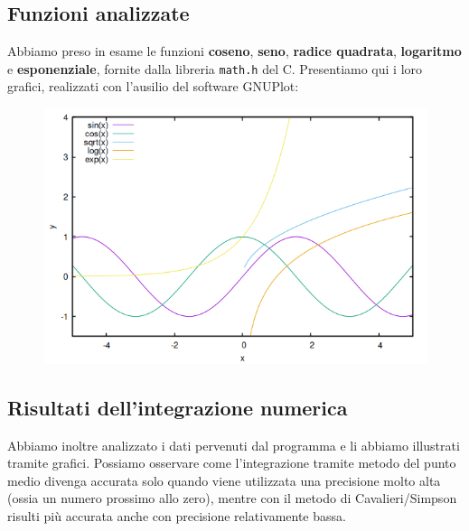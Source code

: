 \documentclass{article}
\begin{document}
\subsection{Funzioni analizzate}
Abbiamo preso in esame le funzioni \textbf{coseno}, \textbf{seno}, \textbf{radice quadrata}, \textbf{logaritmo} e \textbf{esponenziale}, fornite dalla libreria 
\texttt{math.h} del C. Presentiamo qui i loro grafici, realizzati con l'ausilio del software GNUPlot:
\begin{figure}[h]
   \centering
   \includegraphics*[scale=.5]{../grafici/immagini/funzioni.png}
\end{figure}

\subsection{Risultati dell'integrazione numerica}
Abbiamo inoltre analizzato i dati pervenuti dal programma e li abbiamo illustrati tramite grafici. Possiamo osservare come l'integrazione tramite metodo del punto 
medio divenga accurata solo quando viene utilizzata una precisione molto alta (ossia un numero prossimo allo zero), mentre con il metodo di Cavalieri/Simpson risulti 
più accurata anche con precisione relativamente bassa.
\end{document}
